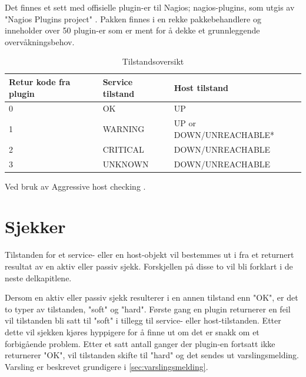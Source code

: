 Det finnes et sett med offisielle plugin-er til Nagios; nagios-plugins, som utgis av "Nagios Plugins project" \cite{nagiosplugins}. Pakken finnes i en rekke pakkebehandlere og inneholder over 50 plugin-er som er ment for å dekke et grunnleggende overvåkningsbehov.

\begin{table}
	\begin{center}
	\begin{threeparttable}
	\begin{tabular}{ | l | l | l |} \hline
    \textbf{Retur kode fra plugin} & \textbf{Service tilstand} & \textbf{Host tilstand} \\ \hline
	0 & OK & UP \\ \hline
	1 & WARNING & UP or DOWN/UNREACHABLE* \\ \hline
	2 & CRITICAL & DOWN/UNREACHABLE \\ \hline
	3 & UNKNOWN & DOWN/UNREACHABLE \\ \hline

	\end{tabular}
	\begin{tablenotes}
	\small
	\item *Ved bruk av Aggressive host checking \cite{icingapluginapi}.
	\end{tablenotes}
	\caption{Tilstandsoversikt}
	\label{state}
	\end{threeparttable}
	\end{center}
\end{table}

\section{Sjekker}\label{sec:sjekker}
Tilstanden for et service- eller en host-objekt vil bestemmes ut i fra et returnert resultat av en aktiv eller passiv sjekk. Forskjellen på disse to vil bli forklart i de neste delkapitlene.

Dersom en aktiv eller passiv sjekk resulterer i en annen tilstand enn "OK", er det to typer av tilstanden, "soft" og "hard". Første gang en plugin returnerer en feil vil tilstanden bli satt til "soft" i tillegg til service- eller host-tilstanden. Etter dette vil sjekken kjøres hyppigere for å finne ut om det er snakk om et forbigående problem. Etter et satt antall ganger der plugin-en fortsatt ikke returnerer "OK", vil tilstanden skifte til "hard" og det sendes ut varslingsmelding. Varsling er beskrevet grundigere i \ref{sec:varslingsmelding}.

